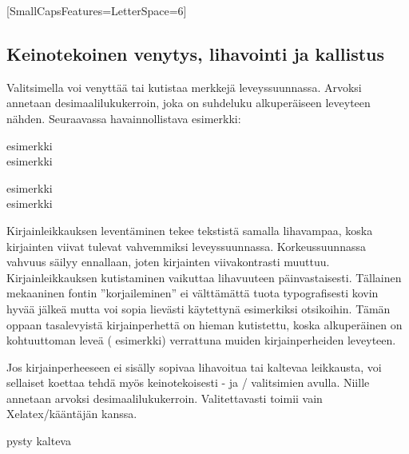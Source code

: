\begin{koodilohkosis}
  \setmainfont{…}[SmallCapsFeatures={LetterSpace=6}]
\end{koodilohkosis}

\subsection{Keinotekoinen venytys, lihavointi ja kallistus}
\label{luku:fontit_venytys}

Valitsimella  voi venyttää tai kutistaa merkkejä
leveyssuunnassa. Arvoksi annetaan desimaalilukukerroin, joka on
suhdeluku alkuperäiseen leveyteen nähden. Seuraavassa havainnollistava
esimerkki:

\begin{koodilohkosis}
  esimerkki \\
  { esimerkki}
\end{koodilohkosis}

\begin{tulossis}
  esimerkki \\
  { esimerkki}
\end{tulossis}

Kirjainleikkauksen leventäminen tekee tekstistä samalla lihavampaa,
koska kirjainten viivat tulevat vahvemmiksi leveyssuunnassa.
Korkeussuunnassa vahvuus säilyy ennallaan, joten kirjainten
viivakontrasti muuttuu. Kirjainleikkauksen kutistaminen vaikuttaa
lihavuuteen päinvastaisesti. Tällainen mekaaninen fontin
''korjaileminen'' ei välttämättä tuota typografisesti kovin hyvää jälkeä
mutta voi sopia lievästi käytettynä esimerkiksi otsikoihin. Tämän oppaan
tasalevyistä kirjainperhettä on hieman kutistettu, koska alkuperäinen on
kohtuuttoman leveä ({\ttfamily{}
  esimerkki}) verrattuna muiden kirjainperheiden leveyteen.

Jos kirjainperheeseen ei sisälly sopivaa lihavoitua tai kaltevaa
leikkausta, voi sellaiset koettaa tehdä myös keinotekoisesti
- ja \-/ valitsimien avulla.
Niille annetaan arvoksi desimaalilukukerroin. Valitettavasti
 toimii vain Xelatex\-/kääntäjän kanssa.

\begin{koodilohkosis}
  pysty { kalteva}
\end{koodilohkosis}

